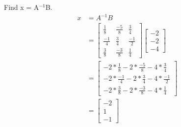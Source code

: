 Find x = A$^{-1}$B.
\begin{align*}
    x
    &= A^{-1}B \\
    &= \begin{bmatrix}
	\frac{1}{8} & \frac{-5}{8} & \frac{3}{4} \\
	\frac{-1}{4} & \frac{3}{4} & \frac{-1}{2} \\
	\frac{3}{8} & \frac{-3}{8} & \frac{1}{4}
    \end{bmatrix}
    \begin{bmatrix}
	-2 \\
	-2 \\
	-4
    \end{bmatrix} \\
    &= \begin{bmatrix}
	-2 * \frac{1}{8} -2 * \frac{-5}{8} -4 * \frac{3}{4} \\
	-2 * \frac{-1}{4} -2 * \frac{3}{4} -4 * \frac{-1}{2} \\
	-2 * \frac{3}{8} -2 * \frac{-3}{8} -4 * \frac{1}{4}
    \end{bmatrix} \\
    &= \begin{bmatrix}
	-2 \\
	1 \\
	-1
    \end{bmatrix}
\end{align*}
